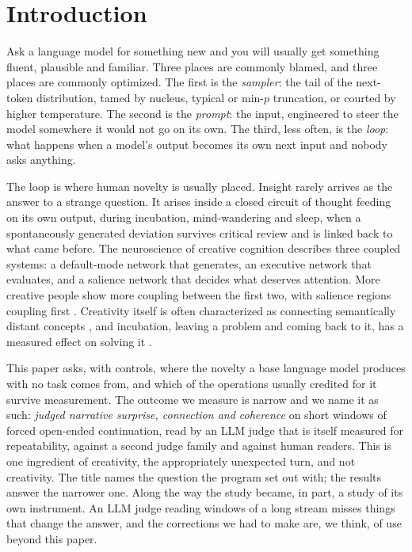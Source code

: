 \section{Introduction}

Ask a language model for something new and you will usually get something
fluent, plausible and familiar. Three places are commonly blamed, and three
places are commonly optimized. The first is the \emph{sampler}: the tail of
the next-token distribution, tamed by nucleus, typical or min-$p$ truncation,
or courted by higher temperature. The second is the \emph{prompt}: the
input, engineered to steer the model somewhere it would not go on its own.
The third, less often, is the \emph{loop}: what happens when a model's output
becomes its own next input and nobody asks anything.

The loop is where human novelty is usually placed. Insight rarely arrives as
the answer to a strange question. It arises inside a closed circuit of
thought feeding on its own output, during incubation, mind-wandering and
sleep, when a spontaneously generated deviation survives critical review and
is linked back to what came before. The neuroscience of creative cognition
describes three coupled systems: a default-mode network that generates, an
executive network that evaluates, and a salience network that decides what
deserves attention. More creative people show more coupling between the
first two, with salience regions coupling first
\citep{beaty2016dynamics,beaty2018robust}. Creativity itself is often
characterized as connecting semantically distant concepts
\citep{kenett2018semantic}, and incubation, leaving a problem and coming back
to it, has a measured effect on solving it \citep{sio2009incubation}.

This paper asks, with controls, where the novelty a base language model
produces with no task comes from, and which of the operations usually
credited for it survive measurement. The outcome we measure is narrow and we
name it as such: \emph{judged narrative surprise, connection and coherence}
on short windows of forced open-ended continuation, read by an LLM judge
that is itself measured for repeatability, against a second judge family
and against human readers. This is one ingredient of creativity, the
appropriately unexpected turn, and not creativity. The title names the
question the program set out with; the results answer the narrower one.
Along the way the study became, in part, a study of its own instrument. An
LLM judge reading windows of a long stream misses things that change the
answer, and the corrections we had to make are, we think, of use beyond
this paper.

